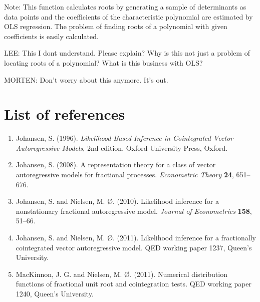 \documentclass[12pt]{article}
\begin{document}
 Note: This function calculates roots by generating a sample of
       determinants as data points and the coefficients of the characteristic
       polynomial are estimated by OLS regression. The problem of finding roots
       of a polynomial with given coefficients is easily calculated. 

LEE: This I dont understand. Please explain? Why is this not just a problem of locating roots of a polynomial? What is this business with OLS?


MORTEN: Don't worry about this anymore. It's out.


\newpage


\section{List of references}

\begin{enumerate}

\item Johansen, S. (1996). \emph{Likelihood-Based Inference in Cointegrated Vector
 Autoregressive Models}, 2nd edition, Oxford University Press, Oxford.

\item Johansen, S. (2008). A representation theory for a class of vector
autoregressive models for fractional processes. \emph{Econometric Theory}
\textbf{24}, 651--676.

\item Johansen, S. and Nielsen, M. \O . (2010). Likelihood inference for a
nonstationary fractional autoregressive model. \emph{Journal of
Econometrics} \textbf{158}, 51--66.

\item Johansen, S. and Nielsen, M. \O . (2011). Likelihood inference for a
fractionally cointegrated vector autoregressive model. QED working paper
1237, Queen's University.

\item MacKinnon, J. G. and Nielsen, M. \O . (2011). Numerical distribution functions of 
fractional unit root and cointegration tests. QED working paper 1240, Queen's University.

\end{enumerate}
\end{document}

